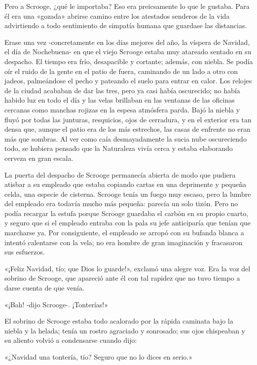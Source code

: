 \documentclass{novela}
\begin{document}
 Pero a Scrooge, ¿qué le importaba? Eso era preicsamente lo que le gustaba. Para él era una «gozada» abrirse camino entre los atestados senderos de la vida advirtiendo a todo sentimiento de simpatía humana que guardase las distancias.

 Erase una vez -concretamente en los días mejores del año, la víspera de Navidad, el día de Nochebuena- en que el viejo Scrooge estaba muy atareado sentado en su despacho. El tiempo era frío, desapacible y cortante; además, con niebla. Se podía oír el ruido de la gente en el patio de fuera, caminando de un lado a otro con jadeos, palmeándose el pecho y pateando el suelo para entrar en calor. Los relojes de la ciudad acababan de dar las tres, pero ya casi había oscurecido; no había habido luz en todo el día y las velas brillaban en las ventanas de las oficinas cercanas como manchas rojizas en la espesa atmósfera parda. Bajó la niebla y fluyó por todas las junturas, resquicios, ojos de cerradura, y en el exterior era tan densa que, aunque el patio era de los más estrechos, las casas de enfrente no eran más que sombras. Al ver como caía desmayadamente la sucia nube oscureciendo todo, se hubiera pensado que la Naturaleza vivía cerca y estaba elaborando cerveza en gran escala.

 La puerta del despacho de Scrooge permanecía abierta de modo que pudiera atisbar a su empleado que estaba copiando cartas en una deprimente y pequeña celda, una especie de cisterna. Scrooge tenía un fuego muy escaso, pero la lumbre del empleado era todavía mucho más pequeña: parecía un solo tizón. Pero no podía recargar la estufa porque Scrooge guardaba el carbón en su propio cuarto, y seguro que si el empleado entraba con la pala su jefe anticiparía que tenían que marcharse ya. Por consiguiente, el empleado se arropó con su bufanda blanca a intentó calentarse con la vela; no era hombre de gran imaginación y fracasaron sus esfuerzos.

 «¡Feliz Navidad, tío; que Dios lo guarde!», exclamó una alegre voz. Era la voz del sobrino de Scrooge, que apareció ante él con tal rapidez que no tuvo tiempo a darse cuenta de que venía.

 «¡Bah! -dijo Scrooge-. ¡Tonterías!»

 El sobrino de Scrooge estaba todo acalorado por la rápida caminata bajo la niebla y la helada; tenía un rostro agraciado y sonrosado; sus ojos chispeaban y su aliento volvió a condensarse cuando dijo:

 «¿Navidad una tontería, tío? Seguro que no lo dices en serio.»
\end{document}
